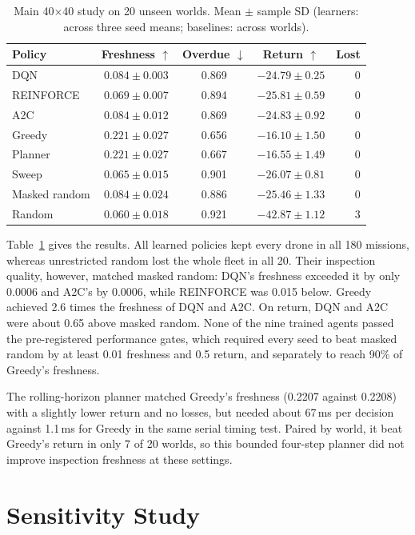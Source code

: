 \begin{table}[!t]
\centering
\caption{Main 40$\times$40 study on 20 unseen worlds. Mean $\pm$ sample SD (learners:
across three seed means; baselines: across worlds).}
\label{tab:main}
\scriptsize
\setlength{\tabcolsep}{3pt}
\begin{tabular}{lcccr}
\toprule
Policy & Freshness $\uparrow$ & Overdue $\downarrow$ & Return $\uparrow$ & Lost \\
\midrule
DQN & $0.084 \pm 0.003$ & 0.869 & $-24.79 \pm 0.25$ & 0 \\
REINFORCE & $0.069 \pm 0.007$ & 0.894 & $-25.81 \pm 0.59$ & 0 \\
A2C & $0.084 \pm 0.012$ & 0.869 & $-24.83 \pm 0.92$ & 0 \\
\midrule
Greedy & $0.221 \pm 0.027$ & 0.656 & $-16.10 \pm 1.50$ & 0 \\
Planner & $0.221 \pm 0.027$ & 0.667 & $-16.55 \pm 1.49$ & 0 \\
Sweep & $0.065 \pm 0.015$ & 0.901 & $-26.07 \pm 0.81$ & 0 \\
Masked random & $0.084 \pm 0.024$ & 0.886 & $-25.46 \pm 1.33$ & 0 \\
Random & $0.060 \pm 0.018$ & 0.921 & $-42.87 \pm 1.12$ & 3 \\
\bottomrule
\end{tabular}
\end{table}

Table~\ref{tab:main} gives the results. All learned policies kept every drone in all 180
missions, whereas unrestricted random lost the whole fleet in all 20. Their inspection
quality, however, matched masked random: DQN's freshness exceeded it by only 0.0006 and A2C's
by 0.0006, while REINFORCE was 0.015 below. Greedy achieved 2.6 times the freshness of DQN and
A2C. On return, DQN and A2C were about 0.65 above masked random. None of the nine trained agents passed
the pre-registered performance gates, which required every seed to beat masked random by at
least 0.01 freshness and 0.5 return, and separately to reach 90\% of Greedy's freshness.

The rolling-horizon planner matched Greedy's freshness (0.2207 against 0.2208) with a slightly
lower return and no losses, but needed about 67\,ms per decision against 1.1\,ms for Greedy in
the same serial timing test. Paired by world, it beat Greedy's return in only 7 of 20 worlds,
so this bounded four-step planner did not improve inspection freshness at these settings.

\section{Sensitivity Study}

